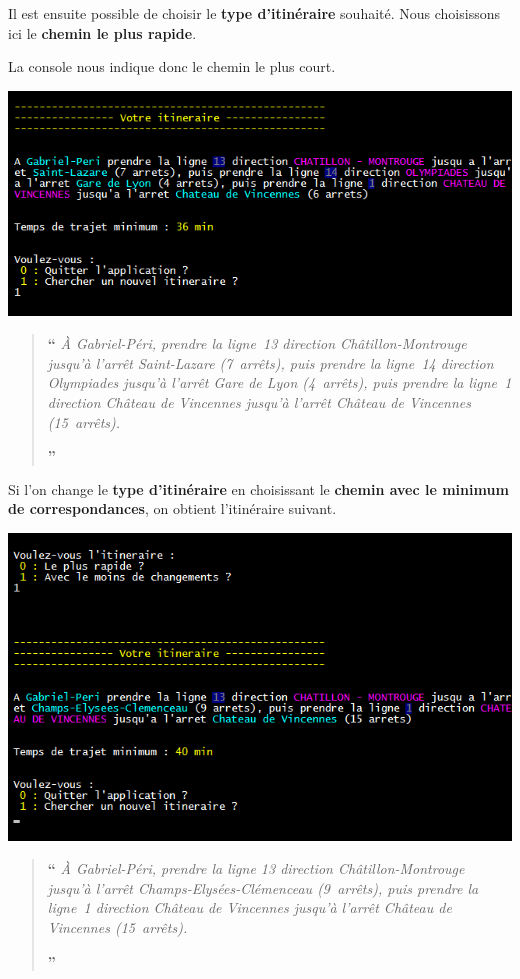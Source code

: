 \documentclass[,french]{article}
\begin{document}
Il est ensuite possible de choisir le \textbf{type d'itinéraire}
souhaité. Nous choisissons ici le \textbf{chemin le plus rapide}.

La console nous indique donc le chemin le plus court.

\includegraphics{img/menu/menu3.png}

\begin{quote}
\Huge\textbf{``}\normalsize
\emph{À Gabriel-Péri, prendre la ligne 13 direction Châtillon-Montrouge jusqu’à l’arrêt Saint-Lazare (7 arrêts), puis prendre la ligne 14 direction Olympiades jusqu’à l’arrêt Gare de Lyon (4 arrêts), puis prendre la ligne 1 direction Château de Vincennes jusqu’à l’arrêt Château de Vincennes (15 arrêts).}
\begin{flushright}
\Huge\textbf{''}\normalsize
\end{flushright}
\end{quote}

Si l'on change le \textbf{type d'itinéraire} en choisissant le
\textbf{chemin avec le minimum de correspondances}, on obtient
l'itinéraire suivant.

\includegraphics{img/menu/menu4.png}

\begin{quote}
\Huge\textbf{``}\normalsize
\emph{À Gabriel-Péri, prendre la ligne 13 direction Châtillon-Montrouge jusqu’à l’arrêt Champs-Elysées-Clémenceau (9 arrêts), puis prendre la ligne 1 direction Château de Vincennes jusqu’à l’arrêt Château de Vincennes (15 arrêts).}
\begin{flushright}
\Huge\textbf{''}\normalsize
\end{flushright}
\end{quote}
\end{document}

